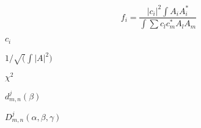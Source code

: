 \documentclass{article}
\begin{document}
\[ f_i = \frac{|c_i|^2 \int A_i A_i^*}{\int \sum c_l c_m^* A_l A_m} \]
\pagebreak

$c_i$
\pagebreak

$ 1/\sqrt(\int |A|^2)$
\pagebreak

$\chi^{2}$
\pagebreak

$d^{j}_{m,n}(\beta)$
\pagebreak

$D^{j}_{m,n}(\alpha,\beta,\gamma)$
\pagebreak
\end{document}
